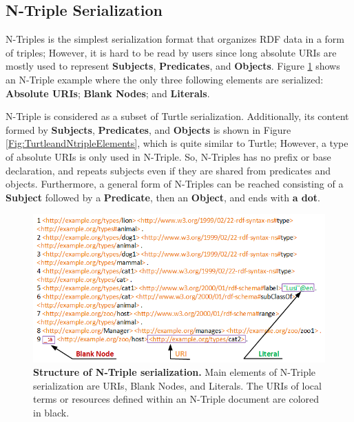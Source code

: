 \subsection{N-Triple Serialization}
N-Triples \cite{W3C:Ntriples:Online} is the simplest serialization format that organizes RDF data in a form of triples; However, it is hard to be read by users since long absolute URIs are mostly used to represent \textbf{Subjects}, \textbf{Predicates}, and \textbf{Objects}. 
Figure \ref{Fig:NTriplesStructure} shows an N-Triple example where the only three following elements are serialized: \textbf{Absolute URIs}; \textbf{Blank Nodes}; and \textbf{Literals}. 

N-Triple is considered as a subset of Turtle serialization. 
Additionally, its content formed by \textbf{Subjects}, \textbf{Predicates}, and \textbf{Objects} is shown in Figure \ref{Fig:TurtleandNtripleElements}, which is quite similar to Turtle; However, a type of absolute URIs is only used in N-Triple. 
So, N-Triples has no prefix or base declaration, and repeats subjects even if they are shared from predicates and objects. Furthermore, a general form of N-Triples can be reached consisting of a \textbf{Subject} followed by a \textbf{Predicate}, then an \textbf{Object}, and ends with \textbf{a dot}.   

\begin{figure}[ht]
	\begin{center}
		\includegraphics[scale=0.8,angle=0]{images/NTriplesStructure.png}
		\caption{\textbf{Structure of N-Triple serialization.} 
		Main elements of N-Triple serialization are URIs, Blank Nodes, and Literals. 
		The URIs of local terms or resources defined within an N-Triple document are colored in black.}
		\label{Fig:NTriplesStructure}
	\end{center}
\end{figure}


